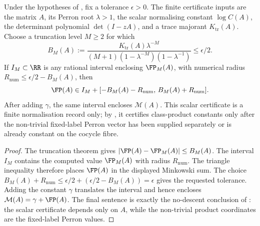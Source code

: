 \begin{corollary}
  \label{cor:scalar-finite-part-finite-io-certificate}
  Under the hypotheses of , fix a tolerance
  \(\epsilon>0\).  The finite certificate inputs are the matrix \(A\), its
  Perron root \(\lambda>1\), the scalar normalising constant \(\log C(A)\), the
  determinant polynomial \(\det(I-zA)\), and a trace majorant
  \(K_{\mathrm{tr}}(A)\).  Choose a truncation level \(M\ge2\) for which
  \[
    B_M(A):=
    \frac{K_{\mathrm{tr}}(A)\lambda^{-M}}
      {(M+1)(1-\lambda^{-M})(1-\lambda^{-1})}
    \le \epsilon/2 .
  \]
  If \(I_M\subset\RR\) is any rational interval enclosing \(\FP_M(A)\), with
  numerical radius \(R_{\mathrm{num}}\le\epsilon/2-B_M(A)\), then
  \[
    \FP(A)
    \in
    I_M+[-B_M(A)-R_{\mathrm{num}},\,B_M(A)+R_{\mathrm{num}}].
  \]
  After adding \(\gamma\), the same interval encloses \(\mathcal M(A)\).  This
  scalar certificate is a finite normalisation record only; by
  , it certifies class-product
  constants only after the non-trivial fixed-label Perron vector has been
  supplied separately or is already constant on the cocycle fibre.
\end{corollary}

\begin{proof}
  The truncation theorem gives \(|\FP(A)-\FP_M(A)|\le B_M(A)\).  The interval
  \(I_M\) contains the computed value \(\FP_M(A)\) with radius
  \(R_{\mathrm{num}}\).  The triangle inequality therefore places \(\FP(A)\) in
  the displayed Minkowski sum.  The choice
  \(B_M(A)+R_{\mathrm{num}}\le\epsilon/2+(\epsilon/2-B_M(A))=\epsilon\)
  gives the requested tolerance.  Adding the constant \(\gamma\) translates the
  interval and hence encloses \(\mathcal M(A)=\gamma+\FP(A)\).  The final
  sentence is exactly the no-descent conclusion of
  : the scalar certificate depends
  only on \(A\), while the non-trivial product coordinates are the
  fixed-label Perron values.
\end{proof}
